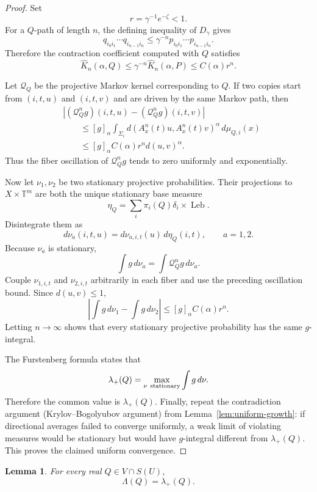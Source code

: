 \documentclass[11pt,a4paper]{amsart}
\newtheorem{lemma}[theorem]{Lemma}
\newcommand{\T}{\mathbb T}
\newcommand{\Leb}{\operatorname{Leb}}
\begin{document}
\begin{proof}
Set
\[
 r=\gamma^{-1}e^{-\zeta}<1.
\]
For a \(Q\)-path of length \(n\), the defining inequality of
\(D_\gamma\) gives
\[
 q_{i_0i_1}\cdots q_{i_{n-1}i_n}
 \le\gamma^{-n}
 p_{i_0i_1}\cdots p_{i_{n-1}i_n}.
\]
Therefore the contraction coefficient computed with \(Q\) satisfies
\[
 \widehat K_n(\alpha,Q)
 \le\gamma^{-n}\widehat K_n(\alpha,P)
 \le C(\alpha)r^n.
\]

Let \(\mathcal Q_Q\) be the projective Markov kernel corresponding to
\(Q\).  If two copies start from \((i,t,u)\) and \((i,t,v)\) and are
driven by the same Markov path, then
\[
\begin{aligned}
 &\left|
 (\mathcal Q_Q^ng)(i,t,u)
 -(\mathcal Q_Q^ng)(i,t,v)
 \right|\\
 &\qquad\le
 [g]_\alpha
 \int_{\Sigma_i}
 d(A_x^n(t)u,A_x^n(t)v)^\alpha
 \,d\mu_{Q,i}(x)\\
 &\qquad\le
 [g]_\alpha C(\alpha)r^n d(u,v)^\alpha.
\end{aligned}
\]
Thus the fiber oscillation of \(\mathcal Q_Q^ng\) tends to zero
uniformly and exponentially.

Now let \(\nu_1,\nu_2\) be two stationary projective probabilities.
Their projections to \(X\times\T^m\) are both the unique stationary
base measure
\[
 \eta_Q=\sum_i\pi_i(Q)\delta_i\times\Leb.
\]
Disintegrate them as
\[
 d\nu_a(i,t,u)=d\nu_{a,i,t}(u)\,d\eta_Q(i,t),
 \qquad a=1,2.
\]
Because \(\nu_a\) is stationary,
\[
 \int g\,d\nu_a=\int\mathcal Q_Q^ng\,d\nu_a.
\]
Couple \(\nu_{1,i,t}\) and \(\nu_{2,i,t}\) arbitrarily in each fiber
and use the preceding oscillation bound.  Since \(d(u,v)\le1\),
\[
 \left|\int g\,d\nu_1-\int g\,d\nu_2\right|
 \le[g]_\alpha C(\alpha)r^n.
\]
Letting \(n\to\infty\) shows that every stationary projective
probability has the same \(g\)-integral.

The Furstenberg formula states that
\[
 \lambda_+(Q)
 =
 \max_{\nu\ {\rm stationary}}\int g\,d\nu.
\]
Therefore the common value is \(\lambda_+(Q)\).  Finally, repeat the contradiction argument (Krylov–Bogolyubov argument) from
Lemma~\ref{lem:uniform-growth}: if directional averages failed to
converge uniformly, a weak limit of violating measures
would be stationary but would have \(g\)-integral different from
\(\lambda_+(Q)\).  This proves the claimed uniform convergence.
\end{proof}

\begin{lemma}\label{lem:direct-identification}
For every real \(Q\in V\cap S(U)\),
\[
 \Lambda(Q)=\lambda_+(Q).
\]
\end{lemma}
\end{document}
